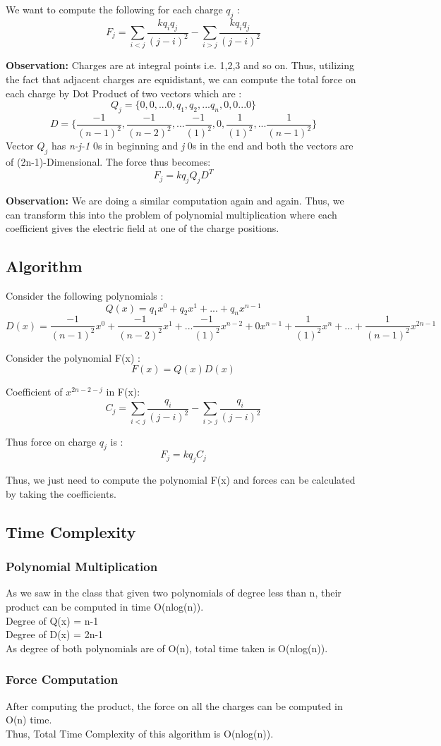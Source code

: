 \documentclass{article}
\begin{document}
We want to compute the following for each charge $q_j$ :
$$ F_j = \sum_{i<j}\frac{kq_iq_j}{(j-i)^{2}} - \sum_{i>j}\frac{kq_iq_j}{(j-i)^{2}}$$

\textbf{Observation: } Charges are at integral points i.e. 1,2,3 and so on. Thus, utilizing the fact that adjacent charges are equidistant, we can compute the total force on each charge by Dot Product of two vectors which are :
$$Q_j = \{0,0, ... 0, q_1,q_2, ... q_n,0,0 ... 0\}$$
$$D = \{ \frac{-1}{(n-1)^2},\frac{-1}{(n-2)^2},... \frac{-1}{(1)^2},0, \frac{1}{(1)^2},... \frac{1}{(n-1)^2}\}$$
Vector $Q_j$ has \textit{n-j-1} 0s in beginning and \textit{j} 0s in the end and both the vectors are of (2n-1)-Dimensional. The force thus becomes:
$$F_j= kq_jQ_jD^{T}$$

\textbf{Observation: }We are doing a similar computation again and again. Thus, we can transform this into the problem of polynomial multiplication where each coefficient gives the electric field at one of the charge positions.

\subsection{Algorithm}

Consider the following polynomials :
$$Q(x) = q_1x^0 + q_2x^1 + ... + q_nx^{n-1}$$
$$D(x) = \frac{-1}{(n-1)^2}x^0 + \frac{-1}{(n-2)^2}x^1 + ... \frac{-1}{(1)^2}x^{n-2} +0x^{n-1}+ \frac{1}{(1)^2}x^{n}+...+ \frac{1}{(n-1)^2}x^{2n-1}$$

Consider the polynomial F(x) :
$$F(x) = Q(x)D(x)$$

Coefficient of $x^{2n-2-j}$ in F(x): 
$$ C_j = \sum_{i<j}\frac{q_i}{(j-i)^{2}} - \sum_{i>j}\frac{q_i}{(j-i)^{2}}$$ 

Thus force on charge $q_j$ is :
$$F_j =  kq_jC_j$$

Thus, we just need to compute the polynomial F(x) and forces can be calculated by taking the coefficients.

\subsection{Time Complexity}
\subsubsection{Polynomial Multiplication}
As we saw in the class that given two polynomials of degree less than n, their product can be computed in time O(nlog(n)).\\
Degree of Q(x) = n-1\\
Degree of D(x) = 2n-1\\
As degree of both polynomials are of O(n), total time taken is O(nlog(n)).

\subsubsection{Force Computation}
After computing the product, the force on all the charges can be computed in O(n) time.\\
Thus, Total Time Complexity of this algorithm is O(nlog(n)).
\end{document}
